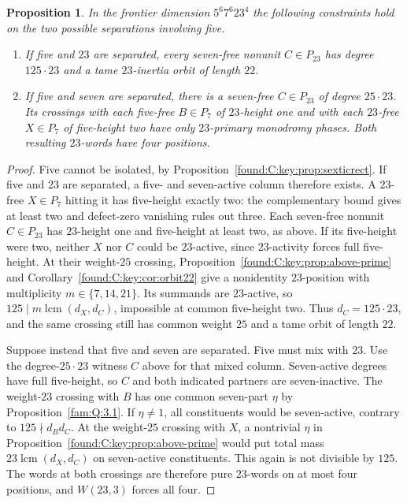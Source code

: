 \documentclass[11pt,a4paper]{article}
\numberwithin{equation}{section}
\newtheorem{proposition}[theorem]{Proposition}
\theoremstyle{remark}
\begin{document}
\begin{proposition}\label{found:C:4.2}\label{found:C:key:prop:remaining-edges}
In the frontier dimension $5^6 7^6 23^4$ the following constraints
hold on the two possible separations involving five.
\begin{enumerate}
\item If five and $23$ are separated, every seven-free nonunit
$C\in P_{23}$ has degree $125\cdot23$ and a tame $23$-inertia orbit
of length $22$.
\item If five and seven are separated, there is a seven-free
$C\in P_{23}$ of degree $25\cdot23$. Its crossings with each five-free
$B\in P_7$ of $23$-height one and with each $23$-free $X\in P_7$
of five-height two have only $23$-primary monodromy phases. Both
resulting $23$-words have four positions.
\end{enumerate}
\end{proposition}
\begin{proof}
Five cannot be isolated, by Proposition~\ref{found:C:key:prop:sexticrect}.
If five and $23$ are separated, a five- and seven-active column therefore
exists. A $23$-free $X\in P_7$ hitting it has five-height exactly two:
the complementary bound gives at least two and defect-zero vanishing
rules out three. Each seven-free nonunit $C\in P_{23}$ has $23$-height
one and five-height at least two, as above. If its five-height were two,
neither $X$ nor $C$ could be $23$-active, since $23$-activity forces
full five-height. At their weight-$25$ crossing, Proposition~\ref{found:C:key:prop:above-prime}
and Corollary~\ref{found:C:key:cor:orbit22} give a nonidentity $23$-position with
multiplicity $m\in\{7,14,21\}$. Its summands are $23$-active, so
$125\mid m\operatorname{lcm}(d_X,d_C)$, impossible at common
five-height two. Thus $d_C=125\cdot23$, and the same crossing still
has common weight $25$ and a tame orbit of length $22$.

Suppose instead that five and seven are separated. Five must mix with
$23$. Use the degree-$25\cdot23$ witness $C$ above for that mixed column. Seven-active
degrees have full five-height, so $C$ and both indicated partners
are seven-inactive. The weight-$23$ crossing with $B$ has one common
seven-part $\eta$ by Proposition~\ref{fam:Q:3.1}. If $\eta\ne1$, all constituents would be seven-active, contrary
to $125\nmid d_Bd_C$. At the weight-$25$ crossing with $X$, a nontrivial
$\eta$ in Proposition~\ref{found:C:key:prop:above-prime} would put total mass
$23\operatorname{lcm}(d_X,d_C)$ on seven-active constituents. This
again is not divisible by $125$. The words at both crossings are
therefore pure $23$-words on at most four positions, and $W(23,3)$
forces all four.
\end{proof}
\end{document}
